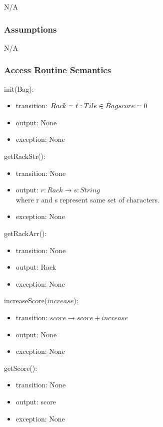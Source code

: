 \documentclass[12pt]{article}
\begin{document}
N/A

\subsubsection* {Assumptions}

N/A

\begin{itemize}

\end{itemize}

\subsubsection* {Access Routine Semantics}

\noindent init(Bag):
\begin{itemize}
\item transition: $Rack = {t : Tile \in Bag}\\
score = 0$
\item output: None
\item exception: None
\end{itemize}

\noindent getRackStr():
\begin{itemize}
\item transition: None
\item output: $r:Rack \rightarrow s:String$ \\
where r and s represent same set of characters.
\item exception: None
\end{itemize}

\noindent getRackArr():
\begin{itemize}
\item transition: None
\item output: Rack
\item exception: None
\end{itemize}

\noindent increaseScore($increase$):
\begin{itemize}
\item transition: $score \rightarrow score+increase$
\item output: None
\item exception: None
\end{itemize}

\noindent getScore():
\begin{itemize}
\item transition: None
\item output: score
\item exception: None
\end{itemize}

\newpage
\end{document}
